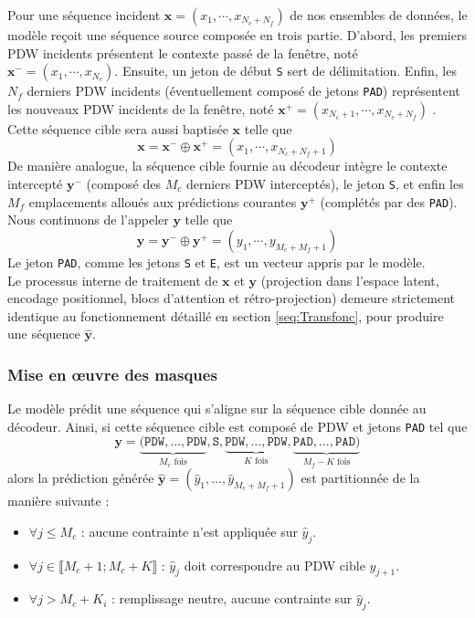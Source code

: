 Pour une séquence incident $\mathbf{x} = (x_1, \cdots, x_{N_c + N_f})$ de nos ensembles de données, le modèle reçoit une séquence source composée
en trois partie. D'abord, les premiers PDW incidents présentent le contexte passé de la fenêtre, noté $\mathbf{x}^- = (x_1, \cdots, x_{N_c})$. Ensuite, un jeton de début \texttt{S} sert de délimitation. Enfin, les $N_f$ derniers PDW incidents (éventuellement composé de jetons \texttt{PAD}) représentent les nouveaux PDW incidents de la fenêtre, noté $\mathbf{x}^+ = (x_{N_c + 1}, \cdots, x_{N_c + N_f})$ . Cette séquence cible sera aussi baptisée $\mathbf{x}$ telle que 
$$\mathbf{x} = \mathbf{x}^- \oplus \mathbf{x}^+ = (x_1, \cdots, x_{N_c + N_f + 1})$$
De manière analogue, la séquence cible fournie au décodeur intègre le contexte intercepté $\mathbf{y}^-$ (composé des $M_c$ derniers PDW interceptés), le jeton \texttt{S}, et enfin les $M_f$ emplacements alloués aux prédictions courantes $\mathbf{y}^+$ (complétés par des \texttt{PAD}). Nous continuons de l'appeler $\mathbf{y}$ telle que 
$$\mathbf{y} = \mathbf{y}^- \oplus \mathbf{y}^+ = (y_1, \cdots, y_{M_c + M_f + 1})$$
Le jeton \texttt{PAD}, comme les jetons \texttt{S} et \texttt{E}, est un vecteur appris par le modèle.\\

Le processus interne de traitement de $\mathbf{x}$ et $\mathbf{y}$ (projection dans l'espace latent, encodage positionnel, blocs d'attention et rétro-projection) demeure strictement identique au fonctionnement détaillé en section \ref{seq:Transfonc}, pour produire une séquence $\mathbf{\hat{y}}$.

\subsubsection{Mise en œuvre des masques}
\label{seq:masquewin}
Le modèle prédit une séquence qui s'aligne sur la séquence cible donnée au décodeur. Ainsi, si cette séquence cible est composé de PDW et jetons \texttt{PAD} tel que 
$$\mathbf{y} = \underbrace{(\texttt{PDW}, \dots, \texttt{PDW}}_{M_c \text{ fois}}, \texttt{S}, \underbrace{\texttt{PDW}, \dots, \texttt{PDW}}_{K \text{ fois}}, \underbrace{\texttt{PAD}, \dots, \texttt{PAD})}_{M_f - K \text{ fois}}$$
alors la prédiction générée $\hat{\mathbf{y}} = (\hat{y}_1, \dots, \hat{y}_{M_c + M_f + 1})$ est partitionnée de la manière suivante :
\begin{itemize}
\item $\forall j \leq M_c$ : aucune contrainte n'est appliquée sur $\hat{y}_j$.
\item $\forall j \in \llbracket M_c + 1; M_c + K \rrbracket$ : $\hat{y}_j$ doit correspondre au PDW cible $y_{j+1}$.
\item $\forall j > M_c + K_i$ : remplissage neutre, aucune contrainte sur $\hat{y}_j$.
\end{itemize}
\; \\

